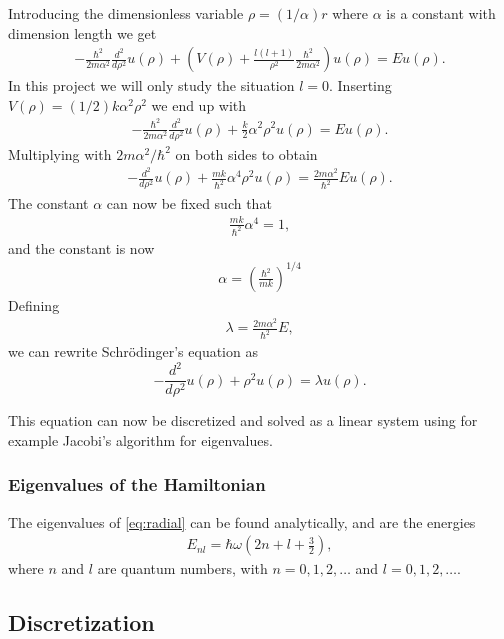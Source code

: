 \documentclass[11pt,a4paper,english,draft]{article}
\numberwithin{equation}{section}
\begin{document}
Introducing the dimensionless variable $\rho = (1/\alpha) r$
where $\alpha$ is a constant with dimension length we get
\begin{gather}
  -\frac{\hbar^2}{2 m \alpha^2} \frac{d^2}{d\rho^2} u(\rho) 
       + \left ( V(\rho) + \frac{l (l + 1)}{\rho^2}
         \frac{\hbar^2}{2 m\alpha^2} \right ) u(\rho)  = E u(\rho) .
\end{gather}
In this project we will only study the situation $l=0$.
Inserting $V(\rho) = (1/2) k \alpha^2\rho^2$ we end up with
\begin{gather}
  -\frac{\hbar^2}{2 m \alpha^2} \frac{d^2}{d\rho^2} u(\rho) 
       + \frac{k}{2} \alpha^2\rho^2u(\rho)  = E u(\rho) .
\end{gather}
Multiplying with $2m\alpha^2/\hbar^2$ on both sides to obtain
\begin{gather}
  -\frac{d^2}{d\rho^2} u(\rho) 
       + \frac{mk}{\hbar^2} \alpha^4\rho^2u(\rho) 
       = \frac{2m\alpha^2}{\hbar^2}E u(\rho) .
\end{gather}
The constant $\alpha$ can now be fixed such that
\begin{gather}
\frac{mk}{\hbar^2} \alpha^4 = 1,
\end{gather}
and the constant is now
\begin{gather}
\alpha = \left(\frac{\hbar^2}{mk}\right)^{1/4}
\end{gather}
Defining 
\begin{gather}
\lambda = \frac{2m\alpha^2}{\hbar^2}E,
\end{gather}
we can rewrite Schrödinger's equation as
\begin{equation}
  -\frac{d^2}{d\rho^2} u(\rho) + \rho^2u(\rho)  = \lambda u(\rho) .
\end{equation}

This equation can now be discretized and solved as a linear system 
using for example Jacobi's algorithm for eigenvalues. 

\subsubsection{Eigenvalues of the Hamiltonian}
The eigenvalues of \eqref{eq:radial} can be found analytically,
and are the energies
\begin{gather}
E_{nl}=  \hbar \omega \left(2n+l+\frac{3}{2}\right),
\end{gather}
where $n$ and $l$ are quantum numbers, with $n = 0, 1, 2, \dots$ and
$l = 0, 1, 2,  \dots $.
 
 
\subsection{Discretization}
\end{document}
